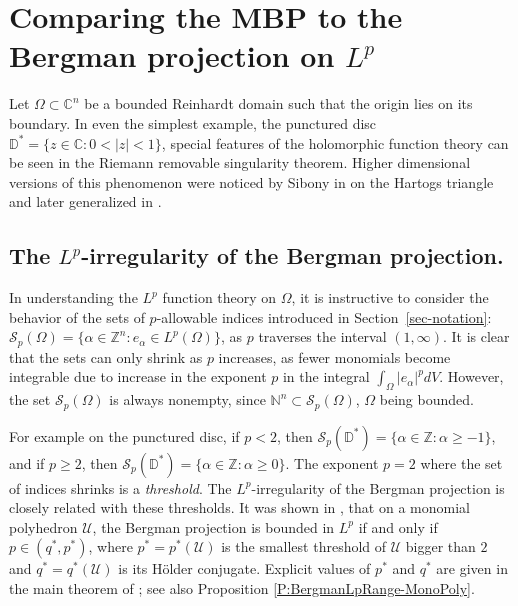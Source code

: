 \documentclass[letterpaper,11pt,reqno]{amsart}
\theoremstyle{plain}
\theoremstyle{definition}
\theoremstyle{remark}
\theoremstyle{remark}
\numberwithin{equation}{section}
\newcommand{\abs}[1]{\left\vert#1\right\vert}
\newcommand{\cs}{{\mathcal S}}
\newcommand{\cx}{{\mathbb C}}
\newcommand{\D}{{\mathbb D}}
\newcommand{\N}{{\mathbb N}}
\newcommand{\Z}{{\mathbb Z}}
\newcommand{\Uu}{\mathscr{U}}
\begin{document}

\section{Comparing the MBP to the Bergman projection on \texorpdfstring{$L^p$}{Lp}}\label{S:BergmanComparison}


Let $\Omega\subset\cx^n$ be a bounded Reinhardt domain such that the origin lies on its boundary. In even the simplest example, the punctured disc $\D^*=\{z\in \cx: 0<\abs{z}<1\}$, special features of the holomorphic function theory can be seen in the Riemann removable singularity theorem. 
Higher dimensional versions of this phenomenon were noticed by Sibony in \cite{sibony1975} on the Hartogs triangle and later generalized in \cite{sibony}.  

\subsection{The \texorpdfstring{$L^p$}{Lp}-irregularity of the Bergman projection.}\label{SS:Lp-reg-Berg-proj}

In understanding the $L^p$ function theory on $\Omega$, it is instructive to consider the behavior of the sets of $p$-allowable indices introduced in Section~\ref{sec-notation}: $\cs_p(\Omega)=\{\alpha\in \Z^n: e_\alpha\in L^p(\Omega)\}$, 
as $p$ traverses the interval $(1,\infty)$. 
It is clear that the sets can only shrink as $p$ increases, as fewer monomials become integrable due to increase in the exponent $p$ in the integral $\int_\Omega \abs{e_\alpha}^p dV$.
However, the set $\cs_p(\Omega)$ is always nonempty,  since $\N^n \subset \cs_p(\Omega)$, $\Omega$ being bounded. 

For example on the punctured disc, if $p<2$, then $\cs_p(\D^*) = \{\alpha \in \Z:\alpha \geq -1\}$, and if $p\geq 2$, then $\cs_p(\D^*) = \{\alpha \in \Z:\alpha \geq 0\}$. 
The exponent $p=2$ where the set of indices shrinks is a \emph{threshold}.
The $L^p$-irregularity of the Bergman projection is closely related with these thresholds.
It was shown in \cite{bcem}, that on a monomial polyhedron $\Uu$, the Bergman projection is bounded
in $L^p$ if and only if $p \in (q^*,p^*)$, where $p^* = p^*(\Uu)$ is the smallest threshold of $\Uu$ bigger than $2$ and $q^* = q^*(\Uu)$ is its Hölder conjugate. 
Explicit values of $p^*$ and $q^*$ are given in the main theorem of \cite{bcem}; see also Proposition \ref{P:BergmanLpRange-MonoPoly}.
\end{document}
